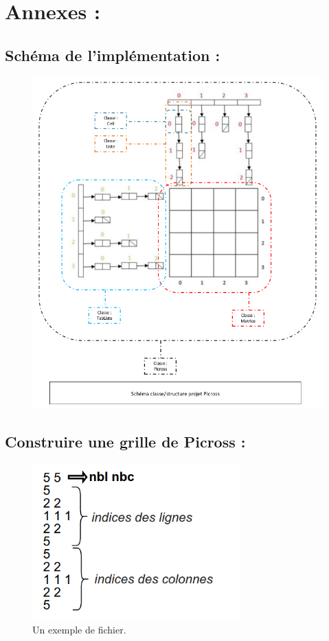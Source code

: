 \documentclass{article}
\begin{document}
\section{Annexes :}
\subsection{Schéma de l'implémentation :}
\begin{landscape}
\begin{figure}
\begin{center}
\includegraphics[width=15cm]{./images/recapitulatif_stucture.png}
\end{center}
\end{figure}
\end{landscape}
\newpage
\subsection{Construire une grille de Picross :}
\begin{figure}[h]
\begin{center}
\includegraphics[width=8cm]{ex2}
\end{center}
\caption{Un exemple de fichier.}
\end{figure}
\newpage
\end{document}
